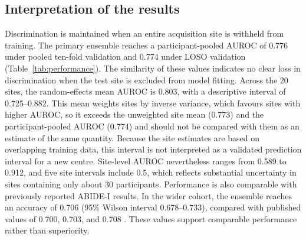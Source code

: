 \subsection{Interpretation of the results}
\label{subsec:discussion-results}

Discrimination is maintained when an entire acquisition site is withheld from training. The primary ensemble reaches a participant-pooled AUROC of 0.776 under pooled ten-fold validation and 0.774 under LOSO validation (Table~\ref{tab:performance}). The similarity of these values indicates no clear loss in discrimination when the test site is excluded from model fitting. Across the 20 sites, the random-effects mean AUROC is 0.803, with a descriptive interval of 0.725--0.882. This mean weights sites by inverse variance, which favours sites with higher AUROC, so it exceeds the unweighted site mean (0.773) and the participant-pooled AUROC (0.774) and should not be compared with them as an estimate of the same quantity. Because the site estimates are based on overlapping training data, this interval is not interpreted as a validated prediction interval for a new centre. Site-level AUROC nevertheless ranges from 0.589 to 0.912, and five site intervals include 0.5, which reflects substantial uncertainty in sites containing only about 30 participants. Performance is also comparable with previously reported ABIDE-I results. In the wider cohort, the ensemble reaches an accuracy of 0.706 (95\% Wilson interval 0.678--0.733), compared with published values of 0.700, 0.703, and 0.708 \citep{Heinsfeldetal2018,Eslamietal2019,AlmuqhimSaeed2021}. These values support comparable performance rather than superiority. 

